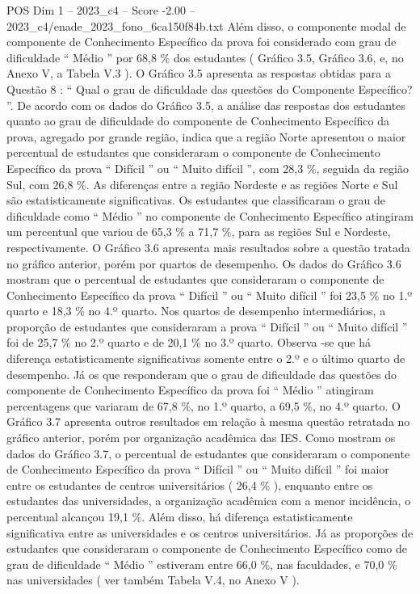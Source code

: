 \begin{textsample}{POS Dim 1 – 2023\_c4 – Score -2.00 – 2023\_c4/enade\_2023\_fono\_6ca150f84b.txt}
Além disso, o componente modal de componente de Conhecimento Específico da prova foi considerado com grau de dificuldade “ Médio ” por 68,8 \% dos estudantes ( Gráfico 3.5, Gráfico 3.6, e, no Anexo V, a Tabela V.3 ).
O Gráfico 3.5 apresenta as respostas obtidas para a Questão 8 : “ Qual o grau de dificuldade das questões do Componente Específico? ”.
De acordo com os dados do Gráfico 3.5, a análise das respostas dos estudantes quanto ao grau de dificuldade do componente de Conhecimento Específico da prova, agregado por grande região, indica que a região Norte apresentou o maior percentual de estudantes que consideraram o componente de Conhecimento Específico da prova “ Difícil ” ou “ Muito difícil ”, com 28,3 \%, seguida da região Sul, com 26,8 \%.
As diferenças entre a região Nordeste e as regiões Norte e Sul são estatisticamente significativas.
Os estudantes que classificaram o grau de dificuldade como “ Médio ” no componente de Conhecimento Específico atingiram um percentual que variou de 65,3 \% a 71,7 \%, para as regiões Sul e Nordeste, respectivamente.
O Gráfico 3.6 apresenta mais resultados sobre a questão tratada no gráfico anterior, porém por quartos de desempenho.
Os dados do Gráfico 3.6 mostram que o percentual de estudantes que consideraram o componente de Conhecimento Específico da prova “ Difícil ” ou “ Muito difícil ” foi 23,5 \% no 1.º quarto e 18,3 \% no 4.º quarto.
Nos quartos de desempenho intermediários, a proporção de estudantes que consideraram a prova “ Difícil ” ou “ Muito difícil ” foi de 25,7 \% no 2.º quarto e de 20,1 \% no 3.º quarto.
Observa -se que há diferença estatisticamente significativas somente entre o 2.º e o último quarto de desempenho.
Já os que responderam que o grau de dificuldade das questões do componente de Conhecimento Específico da prova foi “ Médio ” atingiram percentagens que variaram de 67,8 \%, no 1.º quarto, a 69,5 \%, no 4.º quarto.
O Gráfico 3.7 apresenta outros resultados em relação à mesma questão retratada no gráfico anterior, porém por organização acadêmica das IES.
Como mostram os dados do Gráfico 3.7, o percentual de estudantes que consideraram o componente de Conhecimento Específico da prova “ Difícil ” ou “ Muito difícil ” foi maior entre os estudantes de centros universitários ( 26,4 \% ), enquanto entre os estudantes das universidades, a organização acadêmica com a menor incidência, o percentual alcançou 19,1 \%.
Além disso, há diferença estatisticamente significativa entre as universidades e os centros universitários.
Já as proporções de estudantes que consideraram o componente de Conhecimento Específico como de grau de dificuldade “ Médio ” estiveram entre 66,0 \%, nas faculdades, e 70,0 \% nas universidades ( ver também Tabela V.4, no Anexo V ).

\end{textsample}
